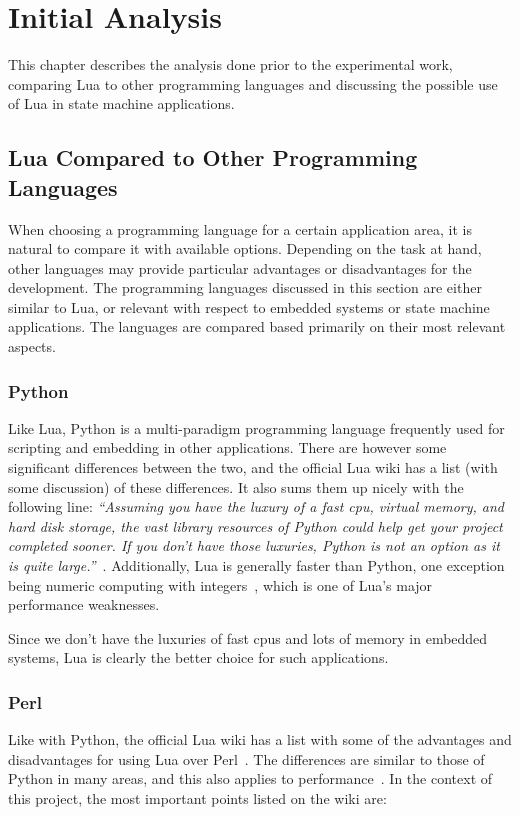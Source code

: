 \chapter{Initial Analysis}
\label{ch:initial_analysis}
This chapter describes the analysis done prior to the experimental work, comparing Lua to other programming languages and discussing the possible use of Lua in state machine applications.

\section{Lua Compared to Other Programming Languages}
\label{sec:lua_compared}
When choosing a programming language for a certain application area, it is natural to compare it with available options. Depending on the task at hand, other languages may provide particular advantages or disadvantages for the development. The programming languages discussed in this section are either similar to Lua, or relevant with respect to embedded systems or state machine applications. The languages are compared based primarily on their most relevant aspects.

\subsection{Python}
\label{sec:lua_vs_python}
Like Lua, Python is a multi-paradigm programming language frequently used for scripting and embedding in other applications. There are however some significant differences between the two, and the official Lua wiki has a list (with some discussion) of these differences. It also sums them up nicely with the following line: \emph{``Assuming you have the luxury of a fast \gls{cpu}, virtual memory, and hard disk storage, the vast library resources of Python could help get your project completed sooner. If you don't have those luxuries, Python is not an option as it is quite large.''}~\cite{website:lua_wiki_python}. Additionally, Lua is generally faster than Python, one exception being numeric computing with integers~\cite{website:lua_perl_python_vs}, which is one of Lua's major performance weaknesses.

\noindent
Since we don't have the luxuries of fast \glspl{cpu} and lots of memory in embedded systems, Lua is clearly the better choice for such applications.

\subsection{Perl}
\label{sec:lua_vs_perl}
Like with Python, the official Lua wiki has a list with some of the advantages and disadvantages for using Lua over Perl~\cite{website:lua_wiki_perl}. The differences are similar to those of Python in many areas, and this also applies to performance~\cite{website:lua_perl_python_vs}. In the context of this project, the most important points listed on the wiki are:

